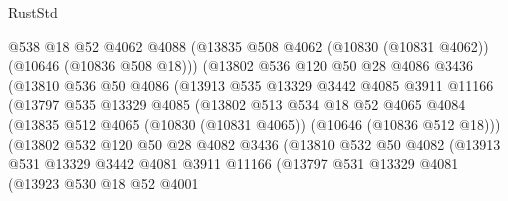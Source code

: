 \begin{lexlean}{RustStd}
\begin{coremodule}
                      @538
                      @18
                      @52
                      @4062
                      @4088
                      (@13835 @508 @4062 (@10830 (@10831 @4062)) (@10646 (@10836 @508 @18)))
                      (@13802
                        @536
                        @120
                        @50
                        @28
                        @4086
                        @3436
                        (@13810
                          @536
                          @50
                          @4086
                          (@13913
                            @535
                            @13329
                            @3442
                            @4085
                            @3911
                            @11166
                            (@13797
                              @535
                              @13329
                              @4085
                              (@13802
                                @513
                                @534
                                @18
                                @52
                                @4065
                                @4084
                                (@13835
                                  @512
                                  @4065
                                  (@10830 (@10831 @4065))
                                  (@10646 (@10836 @512 @18)))
                                (@13802
                                  @532
                                  @120
                                  @50
                                  @28
                                  @4082
                                  @3436
                                  (@13810
                                    @532
                                    @50
                                    @4082
                                    (@13913
                                      @531
                                      @13329
                                      @3442
                                      @4081
                                      @3911
                                      @11166
                                      (@13797
                                        @531
                                        @13329
                                        @4081
                                        (@13923
                                          @530
                                          @18
                                          @52
                                          @4001

\end{coremodule}
\end{lexlean}
